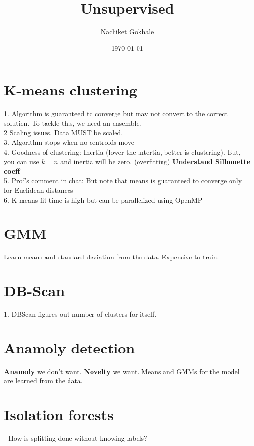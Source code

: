 \documentclass{article}
\begin{document}
\title{Unsupervised}
\author{Nachiket Gokhale}
\date{\today}
\maketitle
\section{K-means clustering}
1. Algorithm is guaranteed to converge but may not convert to the correct solution. To tackle this, we need an ensemble.\\
2 Scaling issues. Data MUST be scaled.\\
3. Algorithm stops when no centroids move\\
4. Goodness of clustering: Inertia (lower the intertia, better is clustering). But, you can use $k=n$ and inertia will be zero. (overfitting) \textbf{Understand Silhouette coeff}\\
5. Prof's comment in chat: But note that means is guaranteed to converge only for Euclidean distances\\
6. K-means fit time is high but can be parallelized using OpenMP


\section{GMM}
Learn means and standard deviation from the data. Expensive to train.

\section{DB-Scan}
1. DBScan figures out number of clusters for itself.

\section{Anamoly detection}
\textbf{Anamoly} we don't want. \textbf{Novelty} we want. Means and GMMs for the model are learned from the data.

\section{Isolation forests}
- How is splitting done without knowing labels?
\end{document}
